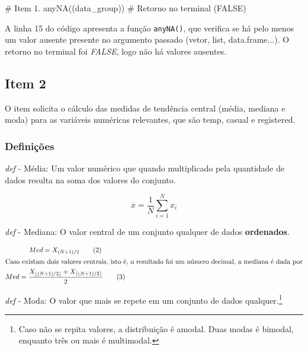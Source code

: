 \documentclass[a4paper, 12pt, titlepage]{article}
\begin{document}
\begin{rcode}[firstnumber=16, caption={Verificação de valores ausentes},breaklines=true, breakatwhitespace=true]
    # Item 1.
    anyNA((data_group)) # Retorno no terminal (FALSE) 
\end{rcode}

A linha 15 do código apresenta a função \texttt{anyNA()}, que verifica se há pelo menos um valor ausente presente no argumento passado (vetor, list, data.frame...). O retorno no terminal foi \textit{FALSE}, logo não há valores ausentes.


\subsection*{Item 2}
O item solicita o cálculo das medidas de tendência central (média, mediana e moda) para as variáveis numéricas relevantes, que são temp, casual e registered.


\subsubsection*{Definições}
\noindent \textit{def} - Média: Um valor numérico que quando multiplicado pela quantidade de dados resulta na soma dos valores do conjunto.

\begin{equation}
    \overline{x}=\frac{1}{N}\sum_{i=1}^{N}x_i
\end{equation}

\noindent \textit{def} - Mediana: O valor central de um conjunto qualquer de dados \textbf{ordenados}. 

\begin{gather*}
      Med = X_{(N+1)/2}   \tag 2    \label{eq:mediana} \\ 
    \intertext{Caso existam dois valores centrais, isto é, o resultado foi um número decimal, a mediana é dada por} 
     Med = \frac{X_{\lfloor (N+1)/2 \rfloor}+X_{\lceil(N+1)/2 \rceil}}{2} \tag 3 
\end{gather*}

\noindent \textit{def} - Moda: O valor que mais se repete em um conjunto de dados qualquer.\footnote[1]{Caso não se repita valores, a distribuição é amodal. Duas modas é bimodal, enquanto três ou mais é multimodal.}
\end{document}

